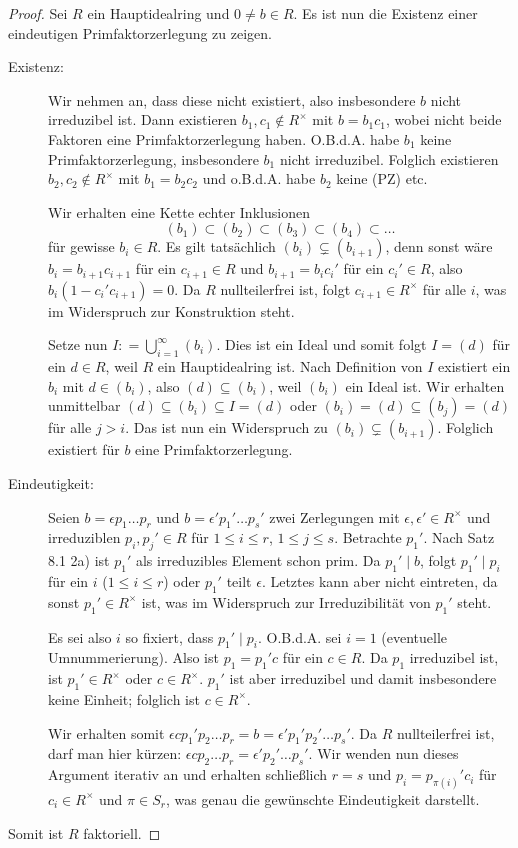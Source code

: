 \documentclass[12pt,a4paper]{scrartcl}
\begin{document}
\begin{proof} Sei $R$ ein Hauptidealring und $0\neq b\in R$. Es ist nun die Existenz einer eindeutigen Primfaktorzerlegung zu zeigen.
\begin{description}
	\item[Existenz:] Wir nehmen an, dass diese nicht existiert, also insbesondere $b$ nicht irreduzibel ist. Dann existieren $b_1,c_1\notin R^{\times}$ mit $b = b_1c_1$, wobei nicht beide Faktoren eine Primfaktorzerlegung haben. O.B.d.A. habe $b_1$ keine Primfaktorzerlegung, insbesondere $b_1$ nicht irreduzibel. Folglich existieren $b_2,c_2\notin R^{\times}$ mit $b_1 = b_2c_2$ und o.B.d.A. habe $b_2$ keine (PZ) etc.
	
	Wir erhalten eine Kette echter Inklusionen
	\[(b_1)\subset (b_2)\subset (b_3)\subset (b_4)\subset \dots\] für gewisse $b_i\in R$. Es gilt tatsächlich $(b_i) \subsetneq (b_{i+1})$, denn sonst wäre $b_i = b_{i+1}c_{i+1}$ für ein $c_{i+1}\in R$ und $b_{i+1} = b_ic_i'$ für ein $c_i'\in R$, also $b_i(1-c_i'c_{i+1}) = 0$. Da $R$ nullteilerfrei ist, folgt $c_{i+1}\in R^{\times}$ für alle $i$, was im Widerspruch zur Konstruktion steht.
	
	Setze nun $I : = \bigcup\limits_{i = 1}^{\infty}(b_i)$. Dies ist ein Ideal und somit folgt $I = (d)$ für ein $d\in R$, weil $R$ ein Hauptidealring ist. Nach Definition von $I$ existiert ein $b_i$ mit $d\in (b_i)$, also $(d)\subseteq (b_i)$, weil $(b_i)$ ein Ideal ist. Wir erhalten unmittelbar $(d) \subseteq (b_i)\subseteq I = (d)$ oder $(b_i) = (d)\subseteq (b_j) = (d)$ für alle $j>i$. Das ist nun ein Widerspruch zu $(b_i) \subsetneq (b_{i+1})$. Folglich existiert für $b$ eine Primfaktorzerlegung.
	\item[Eindeutigkeit:] Seien $b = \epsilon p_1\dots p_r$ und $b = \epsilon'p_1'\dots p_s'$ zwei Zerlegungen mit $\epsilon, \epsilon'\in R^{\times}$ und irreduziblen $p_i, p_j'\in R$ für $1\leq i\leq r$, $1\leq j\leq s$. Betrachte $p_1'$. Nach Satz 8.1 2a) ist $p_1'$ als irreduzibles Element schon prim. Da $p_1'\mid b$, folgt $p_1'\mid p_i$ für ein $i$ ($1\leq i\leq r$) oder $p_1'$ teilt $\epsilon$. Letztes kann aber nicht eintreten, da sonst $p_1'\in R^{\times}$ ist, was im Widerspruch zur Irreduzibilität von $p_1'$ steht.
	
	Es sei also $i$ so fixiert, dass $p_1' \mid p_i$. O.B.d.A. sei $i = 1$ (eventuelle Umnummerierung). Also ist $p_1 = p_1'c$ für ein $c\in R$. Da $p_1$ irreduzibel ist, ist $p_1'\in R^{\times}$ oder $c\in R^{\times}$. $p_1'$ ist aber irreduzibel und damit insbesondere keine Einheit; folglich ist $c\in R^{\times}$.
	
	Wir erhalten somit $\epsilon cp_1'p_2\dots p_r = b = \epsilon 'p_1'p_2'\dots p_s'$. Da $R$ nullteilerfrei ist, darf man hier kürzen: $\epsilon c p_2\dots p_r = \epsilon 'p_2'\dots p_s'$. Wir wenden nun dieses Argument iterativ an und erhalten schließlich $r = s$ und $p_i = p_{\pi(i)}'c_i$ für $c_i\in R^{\times}$ und $\pi\in S_r$, was genau die gewünschte Eindeutigkeit darstellt.
\end{description}
Somit ist $R$ faktoriell.
\end{proof}
\end{document}
